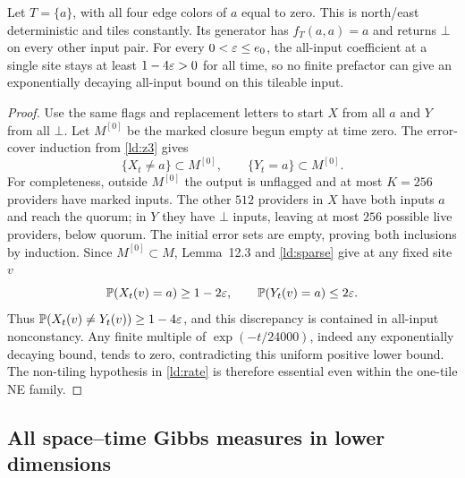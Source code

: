 \begin{example}\label{ld:rate-necessity}
Let $T=\{a\}$, with all four edge colors of $a$ equal to zero. This is north/east deterministic and tiles constantly. Its generator has $f_T(a,a)=a$ and returns $\bot$ on every other input pair. For every $0<\varepsilon\le e_0$, the all-input coefficient at a single site stays at least $1-4\varepsilon>0$ for all time, so no finite prefactor can give an exponentially decaying all-input bound on this tileable input.
\end{example}
\begin{proof}
Use the same flags and replacement letters to start $X$ from all $a$ and $Y$ from all $\bot$. Let $M^{[0]}$ be the marked closure begun empty at time zero. The error-cover induction from \cref{ld:z3} gives
\[
 \{X_t\ne a\}\subset M^{[0]},\qquad
 \{Y_t=a\}\subset M^{[0]}.
\]
For completeness, outside $M^{[0]}$ the output is unflagged and at most $K=256$ providers have marked inputs. The other $512$ providers in $X$ have both inputs $a$ and reach the quorum; in $Y$ they have $\bot$ inputs, leaving at most $256$ possible live providers, below quorum. The initial error sets are empty, proving both inclusions by induction. Since $M^{[0]}\subset M$, Lemma~12.3 and \eqref{ld:sparse} give at any fixed site $v$
\[
 \mathbb{P}(X_t(v)=a)\ge1-2\varepsilon,\qquad
 \mathbb{P}(Y_t(v)=a)\le2\varepsilon.
\]
Thus $\mathbb{P}(X_t(v)\ne Y_t(v))\ge1-4\varepsilon$, and this discrepancy is contained in all-input nonconstancy. Any finite multiple of $\exp(-t/24000)$, indeed any exponentially decaying bound, tends to zero, contradicting this uniform positive lower bound. The non-tiling hypothesis in \cref{ld:rate} is therefore essential even within the one-tile NE family.
\end{proof}


\subsection{All space--time Gibbs measures in lower dimensions}


